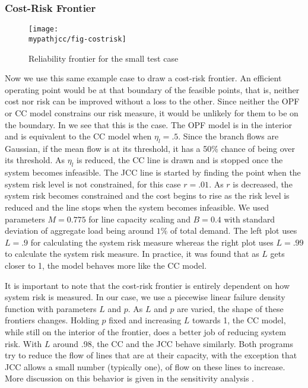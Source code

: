 \subsubsection*{Cost-Risk Frontier}
  \begin{figure} %
\centering
\texttt{[image: \\mypathjcc/fig-costrisk]}
\caption{Reliability frontier for the small test case}\label{costriskfront}
\end{figure}
Now we use this same example case to draw a cost-risk frontier.  An efficient operating point would be at that boundary of the feasible points, that is, neither cost nor risk can be improved without a loss to the other.  Since neither the OPF or CC model constrains our risk measure, it would be unlikely for them to be on the boundary.  In  we see that this is the case.  The OPF model is in the interior and is equivalent to the CC model when $\eta_l=.5$.  Since the branch flows are Gaussian, if the mean flow is at its threshold, it has a 50\% chance of being over its threshold.  As $\eta_l$ is reduced, the CC line is drawn and is stopped once the system becomes infeasible.  The JCC line is started by finding the point when the system risk level is not constrained, for this case $r=.01$.  As $r$ is decreased, the system risk becomes constrained and the cost begins to rise as the risk level is reduced and the line stops when the system becomes infeasible.  We used parameters $M=0.775$ for line capacity scaling and $B=0.4$ with standard deviation of aggregate load being around $1\%$ of total demand.  The left plot uses $L=.9$ for calculating the system risk measure whereas the right plot uses $L=.99$ to calculate the system risk measure.  In practice, it was found that as $L$ gets closer to 1, the model behaves more like the CC model.


It is important to note that the cost-risk frontier is entirely dependent on how system risk is measured.  In our case, we use a piecewise linear failure density function with parameters $L$ and $p$.  As $L$ and $p$ are varied, the shape of these frontiers changes.  Holding $p$ fixed and increasing $L$ towards 1, the CC model, while still on the interior of the frontier, does a better job of reducing system risk.  With $L$ around .98, the CC and the JCC behave similarly.  Both programs try to reduce the flow of lines that are at their capacity, with the exception that JCC allows a small number (typically one), of flow on these lines to increase.  More discussion on this behavior is given in the sensitivity analysis .


